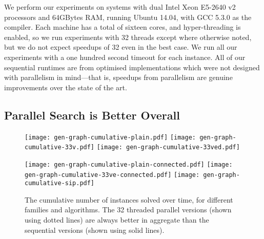 \documentclass[sigconf]{acmart}
\begin{document}
We perform our experiments on systems with dual Intel Xeon E5-2640 v2 processors and 64GBytes RAM,
running Ubuntu 14.04, with GCC 5.3.0 as the compiler. Each machine has a total of sixteen cores, and
hyper-threading is enabled, so we run experiments with 32 threads except where otherwise noted, but
we do not expect speedups of 32 even in the best case.  We run all our experiments with a one
hundred second timeout for each instance. All of our sequential runtimes are from optimised
implementations which were not designed with parallelism in mind---that is, speedups from
parallelism are genuine improvements over the state of the art.

\subsection{Parallel Search is Better Overall}

\begin{figure*}[p]
    \texttt{[image: gen-graph-cumulative-plain.pdf]}
    \hfill
    \texttt{[image: gen-graph-cumulative-33v.pdf]}
    \hfill
    \texttt{[image: gen-graph-cumulative-33ved.pdf]}

    \vspace*{1em}

    \texttt{[image: gen-graph-cumulative-plain-connected.pdf]}
    \hfill
    \texttt{[image: gen-graph-cumulative-33ve-connected.pdf]}
    \hfill
    \texttt{[image: gen-graph-cumulative-sip.pdf]}

    \caption{The cumulative number of instances solved over time, for different families and
    algorithms. The 32 threaded parallel versions (shown using dotted lines) are always better in
aggregate than the sequential versions (shown using solid lines).}\label{figure:cumulative}
\end{figure*}
\end{document}
